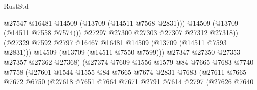 \begin{lexlean}{RustStd}
\begin{coremodule}
                                            @27547
                                            @16481
                                            @14509
                                            (@13709 (@14511 @7568 @2831)))
                                          @14509
                                          (@13709 (@14511 @7558 @7574)))
                                        @27297
                                        @27300
                                        @27303
                                        @27307
                                        @27312
                                        @27318))
                                    (@27329
                                      @7592
                                      @2797
                                      @16467
                                      @16481
                                      @14509
                                      (@13709 (@14511 @7593 @2831)))
                                    @14509
                                    (@13709 (@14511 @7550 @7599)))
                                  @27347
                                  @27350
                                  @27353
                                  @27357
                                  @27362
                                  @27368)
                                (@27374
                                  @7609
                                  @1556
                                  @1579
                                  @84
                                  @7665
                                  @7683
                                  @7740
                                  @7758
                                  (@27601
                                    @1544
                                    @1555
                                    @84
                                    @7665
                                    @7674
                                    @2831
                                    @7683
                                    (@27611
                                      @7665
                                      @7672
                                      @6750
                                      (@27618
                                        @7651
                                        @7664
                                        @7671
                                        @2791
                                        @7614
                                        @2797
                                        (@27626
                                          @7640

\end{coremodule}
\end{lexlean}
